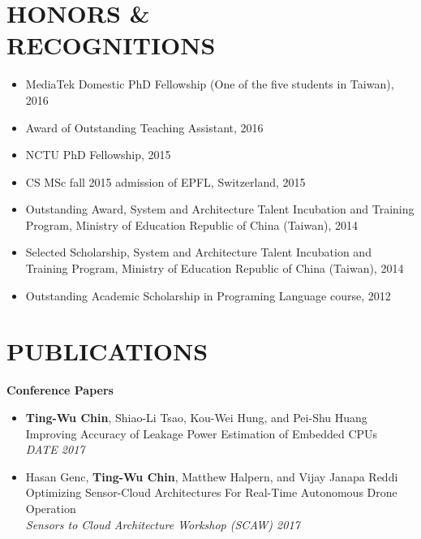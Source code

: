 \documentclass[margin, 9pt]{res} %
\begin{document}
\begin{resume}

\section{HONORS \&\\ RECOGNITIONS}

\vspace*{-1pt}
\begin{itemize}[leftmargin=*] \itemsep -4pt
  \item MediaTek Domestic PhD Fellowship (One of the five students in Taiwan), 2016
  \item Award of Outstanding Teaching Assistant, 2016
	\item NCTU PhD Fellowship, 2015
	\item CS MSc fall 2015 admission of EPFL, Switzerland, 2015
	\item Outstanding Award, System and Architecture Talent Incubation and
  Training Program, Ministry of Education Republic of China (Taiwan), 2014
	\item Selected Scholarship, System and Architecture Talent Incubation and
  Training Program, Ministry of Education Republic of China (Taiwan), 2014
	\item Outstanding Academic Scholarship in Programing Language course, 2012
\end{itemize}


\section{PUBLICATIONS}

{\large\textbf{Conference Papers}}

\begin{itemize}[leftmargin=*] \itemsep 0pt
	\item \textbf{Ting-Wu Chin}, Shiao-Li Tsao, Kou-Wei Hung, and Pei-Shu Huang\\[2pt]
          Improving Accuracy of Leakage Power Estimation of Embedded CPUs\\
          \textit{DATE 2017}
	\item Hasan Genc, \textbf{Ting-Wu Chin}, Matthew Halpern, and Vijay Janapa Reddi\\[2pt]
          Optimizing Sensor-Cloud Architectures For Real-Time Autonomous Drone Operation\\
          \textit{Sensors to Cloud Architecture Workshop (SCAW) 2017}
\end{itemize}


\end{resume}
\end{document}
